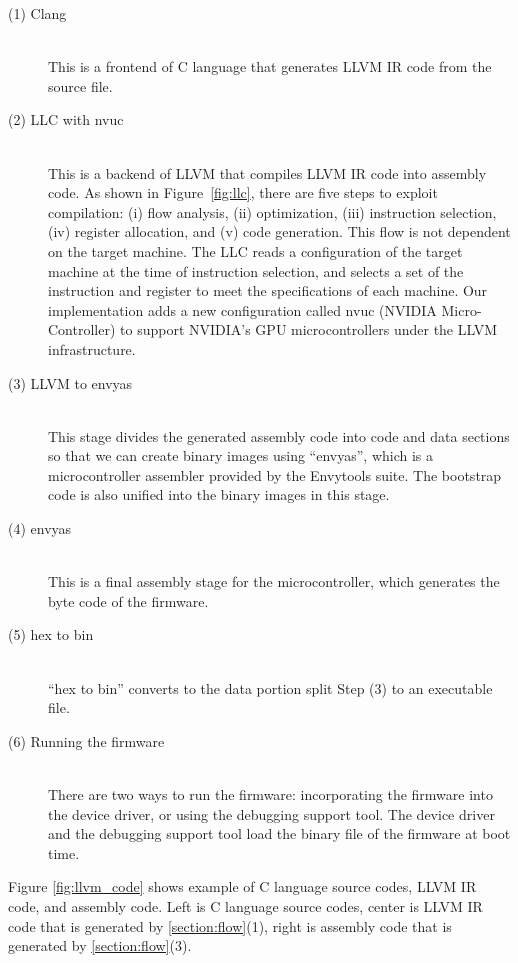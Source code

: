 \begin{description}
\item[ (1) Clang]\mbox{}\\
	   This is a frontend of C language that generates LLVM IR code
	   from the source file.

\item[ (2) LLC with nvuc]\mbox{}\\
	   This is a backend of LLVM that compiles LLVM IR code into
	   assembly code. 
	   As shown in Figure~\ref{fig:llc}, there are five steps to
	   exploit compilation: (i) flow analysis, (ii) optimization,
	   (iii) instruction selection, (iv) register allocation, and
	   (v) code generation.
	   This flow is not dependent on the target machine.
	   The LLC reads a configuration of the target machine at the
	   time of instruction selection, and selects a set of the
	   instruction and register to meet the specifications of each
	   machine.
	   Our implementation adds a new configuration called nvuc
	   (NVIDIA Micro-Controller) to support NVIDIA's GPU
	   microcontrollers under the LLVM infrastructure.

\item[ (3) LLVM to envyas]\mbox{}\\
	   This stage divides the generated assembly code into code and
	   data sections so that we can create binary images using
	   ``envyas'', which is a microcontroller assembler provided by
	   the Envytools suite.
	   The bootstrap code is also unified into the binary images
	   in this stage.
\item[ (4) envyas]\mbox{}\\
	   This is a final assembly stage for the microcontroller, which
	   generates the byte code of the firmware.
\item[ (5) hex to bin]\mbox{}\\
``hex to bin'' converts to the data portion split Step (3) to an executable file.

\item[ (6) Running the firmware]\mbox{}\\
There are two ways to run the firmware: incorporating the firmware into the device driver, or using the debugging support tool.
The device driver and the debugging support tool load the binary file of the firmware at boot time.
\end{description}

Figure \ref{fig:llvm_code} shows example of C language source codes, LLVM IR code, and assembly code.
Left is C language source codes, center is LLVM IR code that is generated by \ref{section:flow}(1), right is assembly code that is generated by \ref{section:flow}(3).

